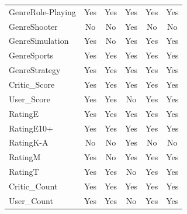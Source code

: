 \documentclass[12pt]{article}
\begin{document}
\begin{table}[ht]
\begin{tabular}{lccccc}
    GenreRole-Playing & Yes & Yes & Yes & Yes & Yes \\
    GenreShooter & No & No & Yes & No & No \\
    GenreSimulation & Yes & No & Yes & Yes & Yes \\
    GenreSports & Yes & Yes & Yes & Yes & Yes \\
    GenreStrategy & Yes & Yes & Yes & Yes & Yes \\
    Critic\_Score & Yes & Yes & Yes & Yes & Yes \\
    User\_Score & Yes & Yes & No & Yes & Yes \\
    RatingE & Yes & Yes & Yes & Yes & Yes \\
    RatingE10+ & Yes & Yes & Yes & Yes & Yes \\
    RatingK-A & No & No & Yes & No & No \\
    RatingM & Yes & No & Yes & Yes & Yes \\
    RatingT & Yes & Yes & No & Yes & Yes \\
    Critic\_Count & Yes & Yes & Yes & Yes & Yes \\
    User\_Count & Yes & Yes & No & Yes & Yes \\
    \hline
  \end{tabular}
\end{table}
\end{document}
